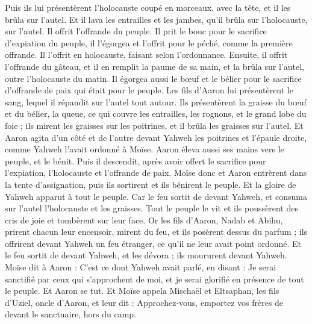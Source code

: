 \begin{multicols}{2}
Puis ils lui présentèrent l'holocauste coupé en morceaux, avec la tête, et il les brûla sur l'autel.
Et il lava les entrailles et les jambes, qu'il brûla sur l'holocauste, sur l'autel.
Il offrit l'offrande du peuple. Il prit le bouc pour le sacrifice d'expiation du peuple, il l'égorgea et l'offrit pour le péché, comme la première offrande.
Il l'offrit en holocauste, faisant selon l'ordonnance.
Ensuite, il offrit l'offrande du gâteau, et il en remplit la paume de sa main, et la brûla sur l'autel, outre l'holocauste du matin.
Il égorgea aussi le bœuf et le bélier pour le sacrifice d'offrande de paix qui était pour le peuple. Les fils d'Aaron lui présentèrent le sang, lequel il répandit sur l'autel tout autour.
Ils présentèrent la graisse du bœuf et du bélier, la queue, ce qui couvre les entrailles, les rognons, et le grand lobe du foie ;
ils mirent les graisses sur les poitrines, et il brûla les graisses sur l'autel.
Et Aaron agita d'un côté et de l'autre devant Yahweh les poitrines et l'épaule droite, comme Yahweh l'avait ordonné à Moïse.
Aaron éleva aussi ses mains vers le peuple, et le bénit. Puis il descendit, après avoir offert le sacrifice pour l'expiation, l'holocauste et l'offrande de paix.
Moïse donc et Aaron entrèrent dans la tente d'assignation, puis ils sortirent et ils bénirent le peuple. Et la gloire de Yahweh apparut à tout le peuple.
Car le feu sortit de devant Yahweh, et consuma sur l'autel l'holocauste et les graisses. Tout le peuple le vit et ils poussèrent des cris de joie et tombèrent sur leur face.
\VerseOne{}Or les fils d'Aaron, Nadab et Abihu, prirent chacun leur encensoir, mirent du feu, et ils posèrent dessus du parfum ; ils offrirent devant Yahweh un feu étranger, ce qu'il ne leur avait point ordonné.
Et le feu sortit de devant Yahweh, et les dévora ; ils moururent devant Yahweh.
Moïse dit à Aaron : C'est ce dont Yahweh avait parlé, en disant : Je serai sanctifié par ceux qui s'approchent de moi, et je serai glorifié en présence de tout le peuple. Et Aaron se tut.
Et Moïse appela Mischaël et Eltsaphan, les fils d'Uziel, oncle d'Aaron, et leur dit : Approchez-vous, emportez vos frères de devant le sanctuaire, hors du camp.

\end{multicols}

